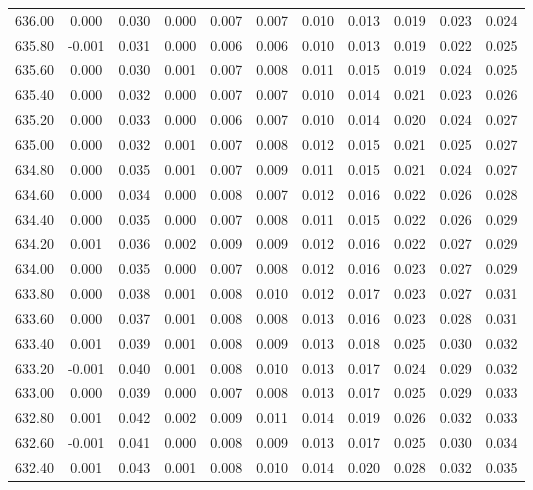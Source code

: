 \begin{longtable}{cccccccccc}
    636.00 &  0.000 &  0.030 &  0.000 &  0.007 &  0.007 &  0.010 &  0.013 &  0.019 &  0.023 &  0.024 \\
    635.80 & -0.001 &  0.031 &  0.000 &  0.006 &  0.006 &  0.010 &  0.013 &  0.019 &  0.022 &  0.025 \\
    635.60 &  0.000 &  0.030 &  0.001 &  0.007 &  0.008 &  0.011 &  0.015 &  0.019 &  0.024 &  0.025 \\
    635.40 &  0.000 &  0.032 &  0.000 &  0.007 &  0.007 &  0.010 &  0.014 &  0.021 &  0.023 &  0.026 \\
    635.20 &  0.000 &  0.033 &  0.000 &  0.006 &  0.007 &  0.010 &  0.014 &  0.020 &  0.024 &  0.027 \\
    635.00 &  0.000 &  0.032 &  0.001 &  0.007 &  0.008 &  0.012 &  0.015 &  0.021 &  0.025 &  0.027 \\
    634.80 &  0.000 &  0.035 &  0.001 &  0.007 &  0.009 &  0.011 &  0.015 &  0.021 &  0.024 &  0.027 \\
    634.60 &  0.000 &  0.034 &  0.000 &  0.008 &  0.007 &  0.012 &  0.016 &  0.022 &  0.026 &  0.028 \\
    634.40 &  0.000 &  0.035 &  0.000 &  0.007 &  0.008 &  0.011 &  0.015 &  0.022 &  0.026 &  0.029 \\
    634.20 &  0.001 &  0.036 &  0.002 &  0.009 &  0.009 &  0.012 &  0.016 &  0.022 &  0.027 &  0.029 \\
    634.00 &  0.000 &  0.035 &  0.000 &  0.007 &  0.008 &  0.012 &  0.016 &  0.023 &  0.027 &  0.029 \\
    633.80 &  0.000 &  0.038 &  0.001 &  0.008 &  0.010 &  0.012 &  0.017 &  0.023 &  0.027 &  0.031 \\
    633.60 &  0.000 &  0.037 &  0.001 &  0.008 &  0.008 &  0.013 &  0.016 &  0.023 &  0.028 &  0.031 \\
    633.40 &  0.001 &  0.039 &  0.001 &  0.008 &  0.009 &  0.013 &  0.018 &  0.025 &  0.030 &  0.032 \\
    633.20 & -0.001 &  0.040 &  0.001 &  0.008 &  0.010 &  0.013 &  0.017 &  0.024 &  0.029 &  0.032 \\
    633.00 &  0.000 &  0.039 &  0.000 &  0.007 &  0.008 &  0.013 &  0.017 &  0.025 &  0.029 &  0.033 \\
    632.80 &  0.001 &  0.042 &  0.002 &  0.009 &  0.011 &  0.014 &  0.019 &  0.026 &  0.032 &  0.033 \\
    632.60 & -0.001 &  0.041 &  0.000 &  0.008 &  0.009 &  0.013 &  0.017 &  0.025 &  0.030 &  0.034 \\
    632.40 &  0.001 &  0.043 &  0.001 &  0.008 &  0.010 &  0.014 &  0.020 &  0.028 &  0.032 &  0.035 \\

\end{longtable}
